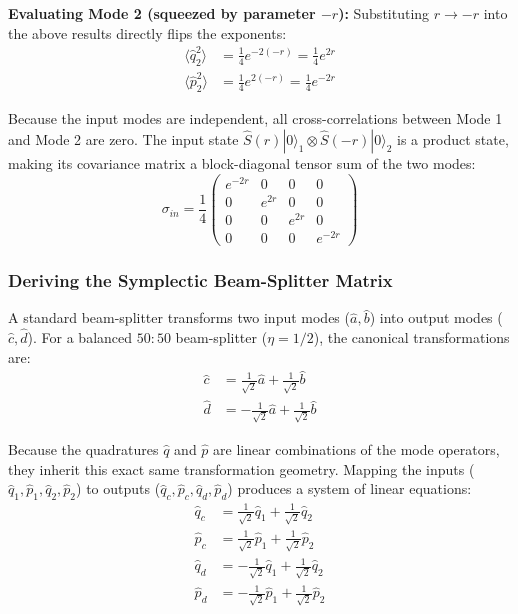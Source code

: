 \textbf{Evaluating Mode 2 (squeezed by parameter $-r$):}
Substituting $r \to -r$ into the above results directly flips the exponents:
\begin{align*}
\langle\hat{q}_2^2\rangle &= \frac{1}{4}e^{-2(-r)} = \frac{1}{4}e^{2r} \\
\langle\hat{p}_2^2\rangle &= \frac{1}{4}e^{2(-r)} = \frac{1}{4}e^{-2r}
\end{align*}

Because the input modes are independent, all cross-correlations between Mode 1 and Mode 2 are zero. The input state $\hat{S}(r)|0\rangle_1 \otimes \hat{S}(-r)|0\rangle_2$ is a product state, making its covariance matrix a block-diagonal tensor sum of the two modes:
\begin{equation*}
\sigma_{in} = \frac{1}{4} \begin{pmatrix} e^{-2r} & 0 & 0 & 0 \\ 0 & e^{2r} & 0 & 0 \\ 0 & 0 & e^{2r} & 0 \\ 0 & 0 & 0 & e^{-2r} \end{pmatrix}
\end{equation*}

\subsubsection{Deriving the Symplectic Beam-Splitter Matrix }
A standard beam-splitter transforms two input modes ($\hat{a}, \hat{b}$) into output modes ($\hat{c}, \hat{d}$). For a balanced $50{:}50$ beam-splitter ($\eta = 1/2$), the canonical transformations are:
\begin{align*}
\hat{c} &= \frac{1}{\sqrt{2}}\hat{a} + \frac{1}{\sqrt{2}}\hat{b} \\
\hat{d} &= -\frac{1}{\sqrt{2}}\hat{a} + \frac{1}{\sqrt{2}}\hat{b}
\end{align*}

Because the quadratures $\hat{q}$ and $\hat{p}$ are linear combinations of the mode operators, they inherit this exact same transformation geometry. Mapping the inputs ($\hat{q}_1, \hat{p}_1, \hat{q}_2, \hat{p}_2$) to outputs ($\hat{q}_c, \hat{p}_c, \hat{q}_d, \hat{p}_d$) produces a system of linear equations:
\begin{align*}
\hat{q}_c &= \frac{1}{\sqrt{2}}\hat{q}_1 + \frac{1}{\sqrt{2}}\hat{q}_2 \\
\hat{p}_c &= \frac{1}{\sqrt{2}}\hat{p}_1 + \frac{1}{\sqrt{2}}\hat{p}_2 \\
\hat{q}_d &= -\frac{1}{\sqrt{2}}\hat{q}_1 + \frac{1}{\sqrt{2}}\hat{q}_2 \\
\hat{p}_d &= -\frac{1}{\sqrt{2}}\hat{p}_1 + \frac{1}{\sqrt{2}}\hat{p}_2
\end{align*}

